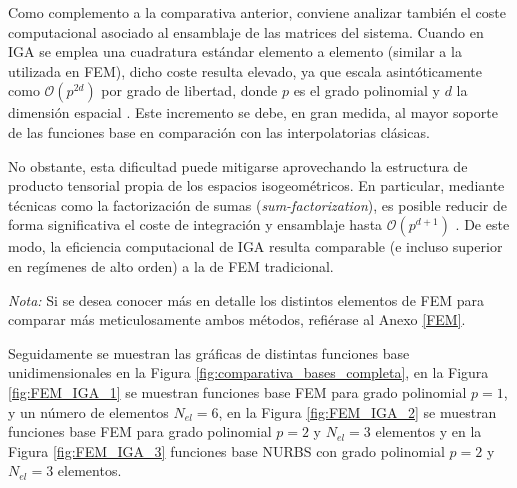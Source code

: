 \documentclass[11pt]{book}
\theoremstyle{plain} %
\theoremstyle{definition} %
\theoremstyle{definition} %
\begin{document}
\vspace{-0.25cm}

Como complemento a la comparativa anterior, conviene analizar también el coste computacional asociado al ensamblaje de las matrices del sistema. Cuando en IGA se
emplea una cuadratura estándar elemento a elemento (similar a la utilizada en FEM), dicho coste resulta elevado, ya que escala asintóticamente como $\mathcal{O}(p^{2d})$
por grado de libertad, donde $p$ es el grado polinomial y $d$ la dimensión espacial \cite{antolin_efficient_2015}. Este incremento se debe, en gran medida, al mayor soporte
de las funciones base en comparación con las interpolatorias clásicas.

No obstante, esta dificultad puede mitigarse aprovechando la estructura de producto tensorial propia de los espacios isogeométricos. En particular, mediante técnicas
como la factorización de sumas (\textit{sum-factorization}), es posible reducir de forma significativa el coste de integración y ensamblaje hasta $\mathcal{O}(p^{d+1})$
\cite{antolin_efficient_2015}. De este modo, la eficiencia computacional de IGA resulta comparable (e incluso superior en regímenes de alto orden) a la de FEM tradicional.

\textit{Nota:} Si se desea conocer más en detalle los distintos elementos de FEM para comparar más meticulosamente ambos métodos, refiérase al Anexo \ref{FEM}.

Seguidamente se muestran las gráficas de distintas funciones base unidimensionales en la Figura \ref{fig:comparativa_bases_completa}, en la Figura \ref{fig:FEM_IGA_1} se muestran
funciones base FEM para grado polinomial $p=1$, y un número de elementos $N_{el}=6$, en la Figura \ref{fig:FEM_IGA_2} se muestran funciones base FEM para grado polinomial
$p=2$ y $N_{el}=3$ elementos y en la Figura \ref{fig:FEM_IGA_3} funciones base NURBS con grado polinomial $p=2$ y $N_{el}=3$ elementos.

\vspace{-0.35cm}
\end{document}
